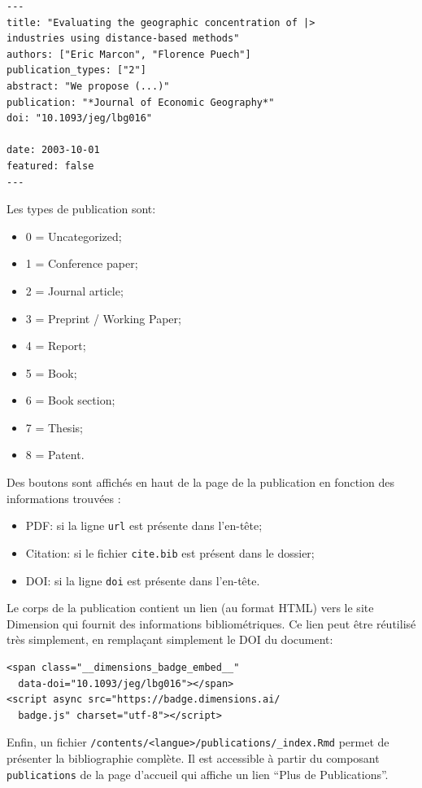 \documentclass[
  12pt,
  french,
  a4paper,
  extrafontsizes,onecolumn,openright
  ]{memoir}
\providecommand{\tightlist}{%
  \setlength{\itemsep}{0pt}\setlength{\parskip}{0pt}}
\begin{document}
\begin{verbatim}
---
title: "Evaluating the geographic concentration of |>
industries using distance-based methods"
authors: ["Eric Marcon", "Florence Puech"]
publication_types: ["2"]
abstract: "We propose (...)"
publication: "*Journal of Economic Geography*"
doi: "10.1093/jeg/lbg016"

date: 2003-10-01
featured: false
---
\end{verbatim}

Les types de publication sont:

\begin{itemize}
\tightlist
\item
  0 = Uncategorized;
\item
  1 = Conference paper;
\item
  2 = Journal article;
\item
  3 = Preprint / Working Paper;
\item
  4 = Report;
\item
  5 = Book;
\item
  6 = Book section;
\item
  7 = Thesis;
\item
  8 = Patent.
\end{itemize}

Des boutons sont affichés en haut de la page de la publication en fonction des informations trouvées :

\begin{itemize}
\tightlist
\item
  PDF: si la ligne \texttt{url} est présente dans l'en-tête;
\item
  Citation: si le fichier \texttt{cite.bib} est présent dans le dossier;
\item
  DOI: si la ligne \texttt{doi} est présente dans l'en-tête.
\end{itemize}

Le corps de la publication contient un lien (au format HTML) vers le site Dimension qui fournit des informations bibliométriques.
Ce lien peut être réutilisé très simplement, en remplaçant simplement le DOI du document:

\begin{verbatim}
<span class="__dimensions_badge_embed__" 
  data-doi="10.1093/jeg/lbg016"></span>
<script async src="https://badge.dimensions.ai/
  badge.js" charset="utf-8"></script>
\end{verbatim}

Enfin, un fichier \texttt{/contents/\textless{}langue\textgreater{}/publications/\_index.Rmd} permet de présenter la bibliographie complète.
Il est accessible à partir du composant \texttt{publications} de la page d'accueil qui affiche un lien \enquote{Plus de Publications}.
\end{document}
